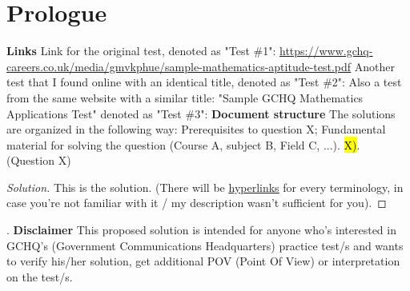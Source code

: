 \documentclass[11pt]{article}
\newenvironment{solution}
  {\renewcommand\qedsymbol{$\blacksquare$}\begin{proof}[Solution]}
  {\end{proof}}
\begin{document}
\section*{Prologue} 
{\Large \bf Links}\newline
Link for the original test, denoted as "Test $\#$1": \newline
{\color{blue} \underline{\url{https://www.gchq-careers.co.uk/media/gmvkphue/sample-mathematics-aptitude-test.pdf}}} \newline \newline Another test that I found online with an identical title, denoted as "Test $\#$2": 
\newline \newline Also a test from the same website with a similar title: "Sample GCHQ Mathematics Applications Test" denoted as "Test $\#$3":
\newline\newline
{\Large \bf Document structure}\newline
The solutions are organized in the following way:\newline\newline
Prerequisites to question X; Fundamental material for solving the question (Course A, subject B, \newline Field C, ...).\newline\newline
\hl{X)}. (Question X)\newline
\begin{solution}
This is the solution. (There will be 
{\color{blue} \href{https://en.wikipedia.org/wiki/Hyperlink#:~:text=In%20computing%2C%20a%20hyperlink%2C%20or,is%20known%20as%20anchor%20text.}{\underline{hyperlinks}}} for every terminology, in case you're not familiar with it / my description wasn't sufficient for you).
\end{solution}
{\color{white}.}\newline
{\Large \bf Disclaimer}\newline
This proposed solution is intended for anyone who's interested in GCHQ's (Government Communications Headquarters) practice test/s and wants to verify his/her solution, get additional POV (Point Of View) or interpretation on the test/s. \newline
\end{document}
